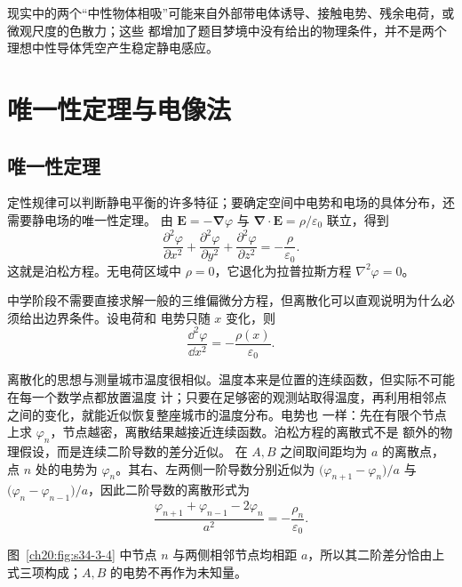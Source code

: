 {\begin{xesolution}
现实中的两个“中性物体相吸”可能来自外部带电体诱导、接触电势、残余电荷，或微观尺度的色散力；这些
都增加了题目梦境中没有给出的物理条件，并不是两个理想中性导体凭空产生稳定静电感应。
\end{xesolution}



\section{唯一性定理与电像法}

\subsection{唯一性定理}


定性规律可以判断静电平衡的许多特征；要确定空间中电势和电场的具体分布，还需要静电场的唯一性定理。
由
$\boldsymbol E=-\boldsymbol\nabla\varphi$ 与 $\boldsymbol\nabla\cdot\boldsymbol E=\rho/\varepsilon_0$
联立，得到
\begin{equation}
  \boxed{\frac{\partial^2\varphi}{\partial x^2}
  +\frac{\partial^2\varphi}{\partial y^2}
  +\frac{\partial^2\varphi}{\partial z^2}
  =-\frac{\rho}{\varepsilon_0}}.
\end{equation}
这就是泊松方程。无电荷区域中 $\rho=0$，它退化为拉普拉斯方程
$\nabla^2\varphi=0$。

中学阶段不需要直接求解一般的三维偏微分方程，但离散化可以直观说明为什么必须给出边界条件。设电荷和
电势只随 $x$ 变化，则
\begin{equation}
  \boxed{\frac{\dd^2\varphi}{\dd x^2}=-\frac{\rho(x)}{\varepsilon_0}}.
\end{equation}

离散化的思想与测量城市温度很相似。温度本来是位置的连续函数，但实际不可能在每一个数学点都放置温度
计；只要在足够密的观测站取得温度，再利用相邻点之间的变化，就能近似恢复整座城市的温度分布。电势也
一样：先在有限个节点上求 $\varphi_n$，节点越密，离散结果越接近连续函数。泊松方程的离散式不是
额外的物理假设，而是连续二阶导数的差分近似。
在 $A,B$ 之间取间距均为 $a$ 的离散点，点 $n$ 处的电势为 $\varphi_n$。其右、左两侧一阶导数分别近似为
$\bigl(\varphi_{n+1}-\varphi_n\bigr)/a$ 与
$\bigl(\varphi_n-\varphi_{n-1}\bigr)/a$，因此二阶导数的离散形式为
\begin{equation}
  \boxed{\frac{\varphi_{n+1}+\varphi_{n-1}-2\varphi_n}{a^2}
  =-\frac{\rho_n}{\varepsilon_0}}.
\end{equation}

图~\ref{ch20:fig:s34-3-4} 中节点 $n$ 与两侧相邻节点均相距 $a$，所以其二阶差分恰由上式三项构成；$A,B$ 的电势不再作为未知量。

}
